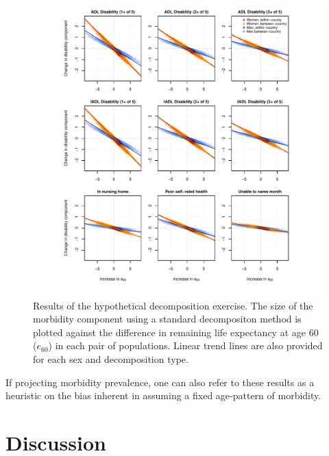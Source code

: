 \documentclass[11pt,oneside,a4paper]{article} %
\begin{document}
\begin{figure}
\begin{adjustwidth}{-1.5cm}{}
	\centering
	\includegraphics[scale=.8]{Figures/Decomp_3x3.pdf}
	\caption{Results of the hypothetical decomposition exercise. The size of the
	morbidity component using a standard decompositon method is plotted against
	the difference in remaining life expectancy at age 60 ($e_{60}$) in each
	pair of populations. Linear trend lines are also provided for each sex and decomposition type.}
	\label{fig:Fig_Decomp_3x3}
\end{adjustwidth}
\end{figure}

If projecting morbidity prevalence, one can also refer to these results as a
heuristic on the bias inherent in assuming a fixed age-pattern of morbidity.

\FloatBarrier
\section{Discussion}
\end{document}
